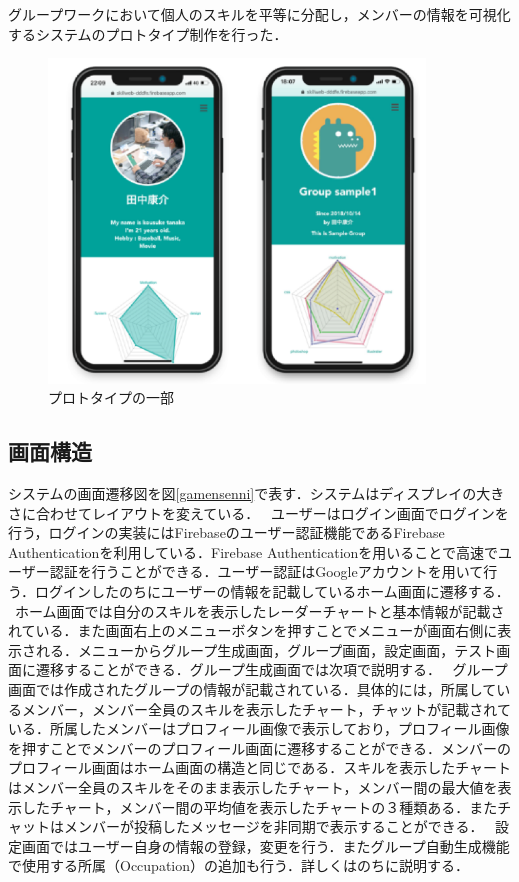 \documentclass{funthesis}
\begin{document}
グループワークにおいて個人のスキルを平等に分配し，メンバーの情報を可視化するシステムのプロトタイプ制作を行った．
\begin{figure}[h]
 \centering
   \includegraphics[width=100mm]{figures/gamen.png}
 \caption{プロトタイプの一部}
 \label{gamen}
\end{figure}

\subsection{画面構造}
システムの画面遷移図を図\ref{gamensenni}で表す．システムはディスプレイの大きさに合わせてレイアウトを変えている．
\ ユーザーはログイン画面でログインを行う，ログインの実装にはFirebaseのユーザー認証機能であるFirebase Authenticationを利用している．Firebase Authenticationを用いることで高速でユーザー認証を行うことができる．ユーザー認証はGoogleアカウントを用いて行う．ログインしたのちにユーザーの情報を記載しているホーム画面に遷移する．
\ ホーム画面では自分のスキルを表示したレーダーチャートと基本情報が記載されている．また画面右上のメニューボタンを押すことでメニューが画面右側に表示される．メニューからグループ生成画面，グループ画面，設定画面，テスト画面に遷移することができる．グループ生成画面では次項で説明する．
\ グループ画面では作成されたグループの情報が記載されている．具体的には，所属しているメンバー，メンバー全員のスキルを表示したチャート，チャットが記載されている．所属したメンバーはプロフィール画像で表示しており，プロフィール画像を押すことでメンバーのプロフィール画面に遷移することができる．メンバーのプロフィール画面はホーム画面の構造と同じである．スキルを表示したチャートはメンバー全員のスキルをそのまま表示したチャート，メンバー間の最大値を表示したチャート，メンバー間の平均値を表示したチャートの３種類ある．またチャットはメンバーが投稿したメッセージを非同期で表示することができる．
\ 設定画面ではユーザー自身の情報の登録，変更を行う．またグループ自動生成機能で使用する所属（Occupation）の追加も行う．詳しくはのちに説明する．
\end{document}
